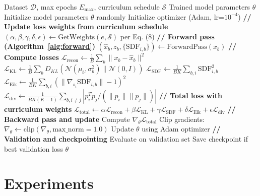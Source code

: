 \documentclass[10pt,twocolumn,letterpaper]{article}
\begin{document}
\begin{algorithm}[p]
\caption{Training with Curriculum Learning}
\label{alg:training}
\small
\begin{algorithmic}[1]
\REQUIRE Dataset $\mathcal{D}$, max epochs $E_{\max}$, curriculum schedule $\mathcal{S}$
\ENSURE Trained model parameters $\theta$
\STATE Initialize model parameters $\theta$ randomly
\STATE Initialize optimizer (Adam, lr=$10^{-4}$)
\STATE
{}
    \STATE \textbf{// Update loss weights from curriculum schedule}
    \STATE $(\alpha, \beta, \gamma, \delta, \epsilon) \leftarrow \text{GetWeights}(e, \mathcal{S})$ per Eq. (8)
    \STATE
        \STATE \textbf{// Forward pass (Algorithm~\ref{alg:forward})}
            \STATE $(\hat{x}_b, z_b, \{\text{SDF}_{i,b}\}) \leftarrow \text{ForwardPass}(x_b)$
        \ENDFOR
        \STATE
        \STATE \textbf{// Compute losses}
        \STATE $\mathcal{L}_{\text{recon}} \leftarrow \frac{1}{B} \sum_b \|x_b - \hat{x}_b\|^2$
        \STATE $\mathcal{L}_{\text{KL}} \leftarrow \frac{1}{B} \sum_b D_{KL}(\mathcal{N}(\mu_b, \sigma_b^2) \| \mathcal{N}(0, I))$
        \STATE $\mathcal{L}_{\text{SDF}} \leftarrow \frac{1}{BK} \sum_{b,i} \text{SDF}_{i,b}^2$
        \STATE $\mathcal{L}_{\text{Eik}} \leftarrow \frac{1}{BK} \sum_{b,i} (\|\nabla_{s_i} \text{SDF}_{i,b}\| - 1)^2$
        \STATE $\mathcal{L}_{\text{div}} \leftarrow \frac{1}{BK(K-1)} \sum_{b,i \neq j} |p_i^T p_j / (\|p_i\| \|p_j\|)|$
        \STATE
        \STATE \textbf{// Total loss with curriculum weights}
        \STATE $\mathcal{L}_{\text{total}} \leftarrow \alpha \mathcal{L}_{\text{recon}} + \beta \mathcal{L}_{\text{KL}} + \gamma \mathcal{L}_{\text{SDF}} + \delta \mathcal{L}_{\text{Eik}} + \epsilon \mathcal{L}_{\text{div}}$
        \STATE
        \STATE \textbf{// Backward pass and update}
        \STATE Compute $\nabla_\theta \mathcal{L}_{\text{total}}$
        \STATE Clip gradients: $\nabla_\theta \leftarrow \text{clip}(\nabla_\theta, \text{max\_norm}=1.0)$
        \STATE Update $\theta$ using Adam optimizer
    \ENDFOR
    \STATE
    \STATE \textbf{// Validation and checkpointing}
        \STATE Evaluate on validation set
        \STATE Save checkpoint if best validation loss
    \ENDIF
\ENDFOR
\STATE
\RETURN $\theta$
\end{algorithmic}
\end{algorithm}
\clearpage

\section{Experiments}
\end{document}

